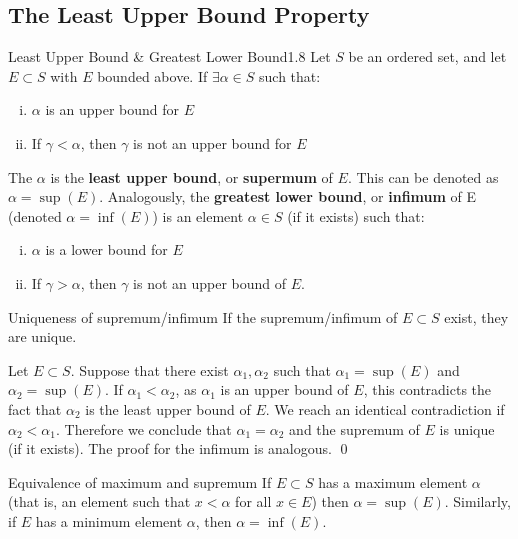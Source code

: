 \subsection{The Least Upper Bound Property}
\begin{definition}{Least Upper Bound \& Greatest Lower Bound}{1.8}
    Let $S$ be an ordered set, and let $E \subset S$ with $E$ bounded above. If $\exists \alpha \in S$ such that:
    \begin{enumerate}[(i)]
        \item $\alpha$ is an upper bound for $E$
        \item If $\gamma < \alpha$, then $\gamma$ is not an upper bound for $E$
    \end{enumerate} 
    The $\alpha$ is the \textbf{least upper bound}, or \textbf{supermum} of $E$. This can be denoted as $\alpha = \sup(E)$. Analogously, the \textbf{greatest lower bound}, or \textbf{infimum} of E (denoted $\alpha = \inf(E)$) is an element $\alpha \in S$ (if it exists) such that:
    \begin{enumerate}[(i)]
        \item $\alpha$ is a lower bound for $E$
        \item If $\gamma > \alpha$, then $\gamma$ is not an upper bound of $E$. 
    \end{enumerate}
\end{definition}

\begin{ntheorem}{Uniqueness of supremum/infimum}
    If the supremum/infimum of $E \subset S$ exist, they are unique.
\end{ntheorem}
\begin{nproof}
        Let $E \subset S$. Suppose that there exist $\alpha_1, \alpha_2$ such that $\alpha_1 = \sup(E)$ and $\alpha_2 = \sup(E)$. If $\alpha_1 < \alpha_2$, as $\alpha_1$ is an upper bound of $E$, this contradicts the fact that $\alpha_2$ is the least upper bound of $E$. We reach an identical contradiction if $\alpha_2 < \alpha_1$. Therefore we conclude that $\alpha_1 = \alpha_2$ and the supremum of $E$ is unique (if it exists). The proof for the infimum is analogous. \qed
\end{nproof}

\begin{ntheorem}{Equivalence of maximum and supremum}
    If $E \subset S$ has a maximum element $\alpha$ (that is, an element such that $x < \alpha$ for all $x \in E$) then $\alpha = \sup(E)$. Similarly, if $E$ has a minimum element $\alpha$, then $\alpha = \inf(E)$.
\end{ntheorem}

